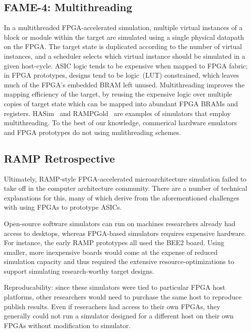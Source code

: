 \subsection{FAME-4: Multithreading}

In a multithreaded FPGA-accelerated simulation, multiple virtual instances of a
block or module within the target are simulated using a single physical
datapath on the FPGA. The target state is duplicated according to the number of
virtual instances, and a scheduler selects which virtual instance should be
simulated in a given host-cycle. ASIC logic tends to be expensive when mapped
to FPGA fabric; in FPGA prototypes, designs tend to be logic~(LUT) constrained,
which leaves much of the FPGA's embedded BRAM left unused.  Multithreading
improves the mapping efficiency of the target, by reusing the expensive logic
over multiple copies of target state which can be mapped into abundant FPGA BRAMs and registers.
HASim~\cite{HASim} and RAMPGold~\cite{RampGold} are examples of simulators that
employ multithreading. To the best of our knowledge, commerical hardware
emulators and FPGA prototypes do not using mulithreading schemes.

\subsection{RAMP Retrospective}

Ultimately, RAMP-style FPGA-accelerated microarchitecture simulation failed to take off
in the computer architecture community. There are a number of technical explanations for this, many of which
derive from the aforementioned challenges with using FPGAs to prototype ASICs.

Open-source software simulators can run on machines researchers already had access to desktops,
whereas FPGA-based simulators requires expensive hardware. For instance, the early RAMP prototypes all used
the BEE2 board. Using smaller, more inexpensive boards would come at the expense of reduced simulation capacity
and thus required the extensive resource-optimizations to support simulating research-worthy target designs.

Reproducability: since these simulators were tied to particular FPGA host
platforms, other researchers would need to purchase the same host to reproduce
publish results. Even if reserachers had access to their own FPGAs, they
generally could not run a simulator designed for a different host on their own
FPGAs without modification to simulator.

